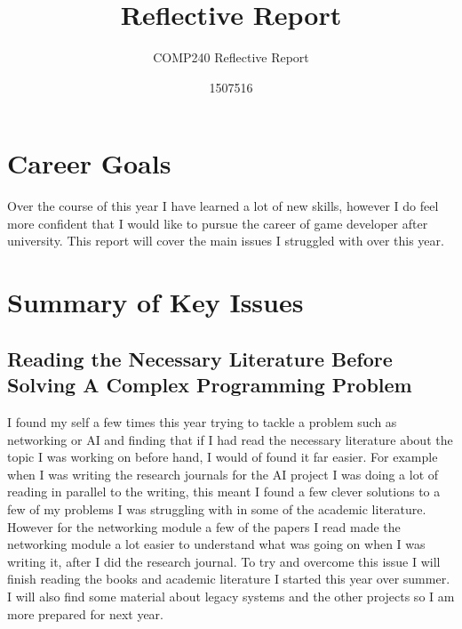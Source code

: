 \documentclass{scrartcl}
\title{Reflective Report}
\subtitle{COMP240 Reflective Report}
\author{1507516}
\begin{document}
\maketitle


\section{Career Goals}
Over the course of this year I have learned a lot of new skills, however I do feel more confident that I would like to pursue the career of game developer after university.
This report will cover the main issues I struggled with over this year.


\section{Summary of Key Issues}
\subsection{Reading the Necessary Literature Before Solving A Complex Programming Problem}
I found my self a few times this year trying to tackle a problem such as networking or AI and finding that if I had read the necessary literature about the topic I was working on before hand, I would of found it far easier. For example when I was writing the research journals for the AI project I was doing a lot of reading in parallel to the writing, this meant I found a few clever solutions to a few of my problems I was struggling with in some of the academic literature. However for the networking module a few of the papers I read made the networking module a lot easier to understand what was going on when I was writing it, after I did the research journal.
To try and overcome this issue I will finish reading the books and academic literature I started this year over summer. I will also find some material about legacy systems and the other projects so I am more prepared for next year.

\end{document}

